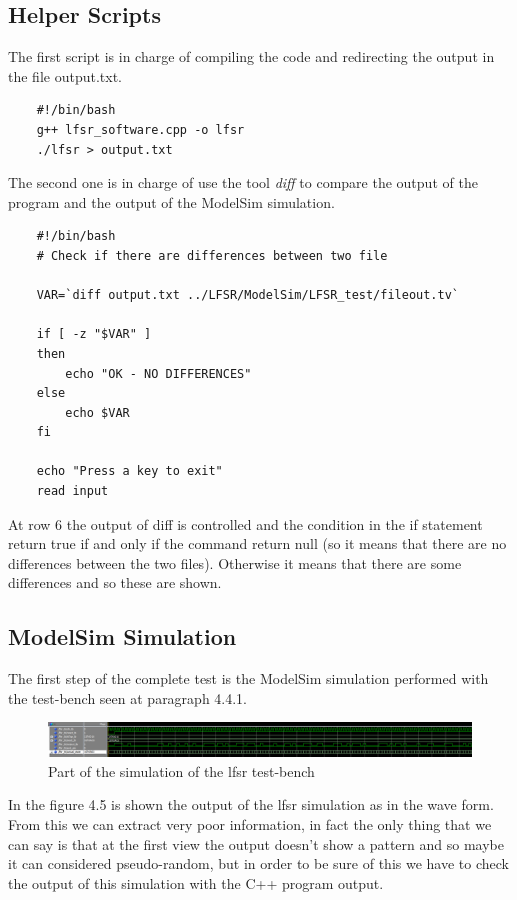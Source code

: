 \documentclass[a4paper]{report}
\begin{document}
\subsection{Helper Scripts}
The first script is in charge of compiling the code and redirecting the output in the file output.txt.
\lstset{ %
	language=sh }
\begin{lstlisting}	
	#!/bin/bash
	g++ lfsr_software.cpp -o lfsr
	./lfsr > output.txt
\end{lstlisting}

\noindent The second one is in charge of use the tool \emph{diff} to compare the output of the program and the output of the ModelSim simulation.
\begin{lstlisting}	
	#!/bin/bash
	# Check if there are differences between two file
	
	VAR=`diff output.txt ../LFSR/ModelSim/LFSR_test/fileout.tv`
	
	if [ -z "$VAR" ]
	then
		echo "OK - NO DIFFERENCES"
	else
		echo $VAR
	fi
	
	echo "Press a key to exit"
	read input
\end{lstlisting}

\noindent At row 6 the output of diff is controlled and the condition in the if statement return true if and only if the command return null (so it means that there are no differences between the two files). Otherwise it means that there are some differences and so these are shown.

\subsection{ModelSim Simulation}
The first step of the complete test is the ModelSim simulation performed with the test-bench seen at paragraph 4.4.1.
\begin{figure}[htpb]
	\centering
	\includegraphics[width=.64\textheight, height=.09\textheight]{img/tb/wave_lfsr_test2.png}
	\caption{Part of the simulation of the lfsr test-bench}
\end{figure}

\noindent In the figure 4.5 is shown the output of the lfsr simulation as in the wave form. From this we can extract very poor information, in fact the only thing that we can say is that at the first view the output doesn't show a pattern and so maybe it can considered pseudo-random, but in order to be sure of this we have to check the output of this simulation with the C++ program output.
\end{document}
